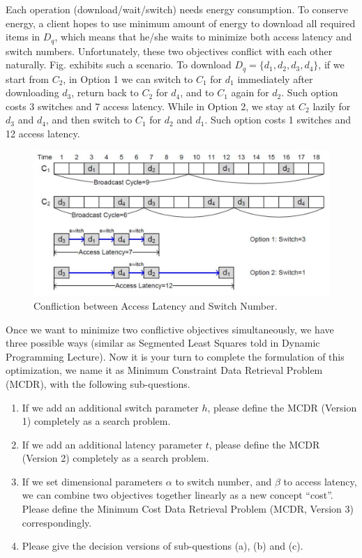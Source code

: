 \documentclass[12pt,a4paper]{article}
\theoremstyle{definition}
\begin{document}
\begin{enumerate}
Each operation (download/wait/switch) needs energy consumption. To conserve energy, a client hopes to use minimum amount of energy to download all required items in $D_q$, which means that he/she waits to minimize both access latency and switch numbers. Unfortunately, these two objectives conflict with each other naturally. Fig. exhibits such a scenario. To download $D_q=\{d_1, d_2, d_3, d_4\}$, if we start from $C_2$, in Option 1 we can switch to $C_1$ for $d_1$ immediately after downloading $d_3$, return back to $C_2$ for $d_4$, and to $C_1$ again for $d_2$. Such option costs 3 switches and 7 access latency. While in Option 2, we stay at $C_2$ lazily for $d_3$ and $d_4$, and then switch to $C_1$ for $d_2$ and $d_1$. Such option costs 1 switches and 12 access latency.


\begin{figure}[!htbp]
	\centering
	\includegraphics[scale= 0.5]{Fig-Conflict.pdf}
	\caption{Confliction between Access Latency and Switch Number.} \label{Fig-Conflict}
\end{figure}

Once we want to minimize two conflictive objectives simultaneously, we have three possible ways (similar as Segmented Least Squares told in Dynamic Programming Lecture). Now it is your turn to complete the formulation of this optimization, we name it as Minimum Constraint Data Retrieval Problem (MCDR), with the following sub-questions.
\begin{enumerate}
	\item If we add an additional switch parameter $h$, please define the MCDR (Version 1) completely as a search problem.
	\item If we add an additional latency parameter $t$, please define the MCDR (Version 2) completely as a search problem.
	\item If we set dimensional parameters $\alpha$ to switch number, and $\beta$ to access latency, we can combine two objectives together linearly as a new concept ``cost''. Please define the Minimum Cost Data Retrieval Problem (MCDR, Version 3) correspondingly.
	\item Please give the decision versions of sub-questions (a), (b) and (c).
\end{enumerate}
\end{enumerate}

\end{document}

